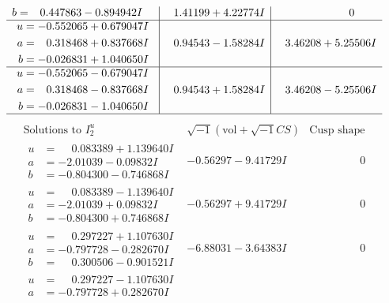 \documentclass[1p]{elsarticle_modified}
\theoremstyle{definition}
\newcommand{\I}{\sqrt{-1}}
\begin{document}
$$\begin{array}{c|c|c}
\begin{aligned}
b &= \phantom{-}0.447863 - 0.894942 I\end{aligned}
 & \phantom{-}1.41199 + 4.22774 I & \phantom{-0.000000 } 0 \\ \hline\begin{aligned}
u &= -0.552065 + 0.679047 I \\
a &= \phantom{-}0.318468 + 0.837668 I \\
b &= -0.026831 + 1.040650 I\end{aligned}
 & \phantom{-}0.94543 - 1.58284 I & \phantom{-}3.46208 + 5.25506 I \\ \hline\begin{aligned}
u &= -0.552065 - 0.679047 I \\
a &= \phantom{-}0.318468 - 0.837668 I \\
b &= -0.026831 - 1.040650 I\end{aligned}
 & \phantom{-}0.94543 + 1.58284 I & \phantom{-}3.46208 - 5.25506 I\\
 \hline 
 \end{array}$$\newpage$$\begin{array}{c|c|c}  
\text{Solutions to }I^u_{2}& \I (\text{vol} + \sqrt{-1}CS) & \text{Cusp shape}\\
 \hline 
\begin{aligned}
u &= \phantom{-}0.083389 + 1.139640 I \\
a &= -2.01039 - 0.09832 I \\
b &= -0.804300 - 0.746868 I\end{aligned}
 & -0.56297 - 9.41729 I & \phantom{-0.000000 } 0 \\ \hline\begin{aligned}
u &= \phantom{-}0.083389 - 1.139640 I \\
a &= -2.01039 + 0.09832 I \\
b &= -0.804300 + 0.746868 I\end{aligned}
 & -0.56297 + 9.41729 I & \phantom{-0.000000 } 0 \\ \hline\begin{aligned}
u &= \phantom{-}0.297227 + 1.107630 I \\
a &= -0.797728 - 0.282670 I \\
b &= \phantom{-}0.300506 - 0.901521 I\end{aligned}
 & -6.88031 - 3.64383 I & \phantom{-0.000000 } 0 \\ \hline\begin{aligned}
u &= \phantom{-}0.297227 - 1.107630 I \\
a &= -0.797728 + 0.282670 I \\

\end{aligned}
\end{array}$$
\end{document}
